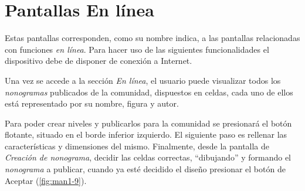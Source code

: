   \section{Pantallas En línea}
  Estas pantallas corresponden, como su nombre indica, a las pantallas
  relacionadas con funciones \textit{en línea}. Para hacer uso de las
  siguientes funcionalidades el dispositivo debe de disponer de conexión
  a Internet.

  Una vez se accede a la sección \textit{En línea}, el usuario puede visualizar
  todos los \textit{nonogramas} publicados de la comunidad, dispuestos en
  celdas, cada uno de ellos está representado por su nombre, figura y autor.

  Para poder crear niveles y publicarlos para la comunidad se presionará
  el botón flotante, situado en el borde inferior izquierdo. El siguiente
  paso es rellenar las características y dimensiones del mismo. Finalmente,
  desde la pantalla de \textit{Creación de nonograma}, decidir las celdas
  correctas, ``dibujando'' y formando el \textit{nonograma} a publicar, cuando
  ya esté decidido el diseño presionar el botón de Aceptar (\autoref{fig:man1-9}).


